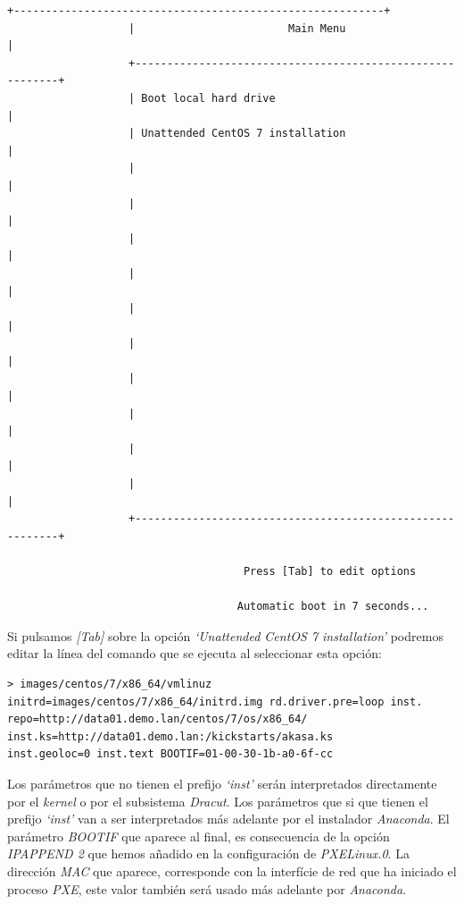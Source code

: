 \documentclass[a4paper,12pt,spanish,final]{epsc_tfc_pfc}
\begin{document}
\begin{lstlisting}[style=dnsmasq]
                   +----------------------------------------------------------+
                   |                        Main Menu                         |
                   +----------------------------------------------------------+
                   | Boot local hard drive                                    |
                   | Unattended CentOS 7 installation                         |
                   |                                                          |
                   |                                                          |
                   |                                                          |
                   |                                                          |
                   |                                                          |
                   |                                                          |
                   |                                                          |
                   |                                                          |
                   |                                                          |
                   |                                                          |
                   +----------------------------------------------------------+

                                     Press [Tab] to edit options

                                    Automatic boot in 7 seconds...
\end{lstlisting}

Si pulsamos \emph{[Tab]} sobre la opción \emph{`Unattended CentOS 7 installation'} podremos editar la línea del comando que se ejecuta al seleccionar esta opción:\\

\begin{lstlisting}[style=dnsmasq]
> images/centos/7/x86_64/vmlinuz initrd=images/centos/7/x86_64/initrd.img rd.driver.pre=loop inst.
repo=http://data01.demo.lan/centos/7/os/x86_64/ inst.ks=http://data01.demo.lan:/kickstarts/akasa.ks
inst.geoloc=0 inst.text BOOTIF=01-00-30-1b-a0-6f-cc
\end{lstlisting}

Los parámetros que no tienen el prefijo \emph{`inst'} serán interpretados directamente por el \emph{kernel} o por el subsistema \emph{Dracut}. Los parámetros que si que tienen el prefijo \emph{`inst'} van a ser interpretados más adelante por el instalador \emph{Anaconda}. El parámetro \emph{BOOTIF} que aparece al final, es consecuencia de la opción \emph{IPAPPEND 2} que hemos añadido en la configuración de \emph{PXELinux.0}. La dirección \emph{MAC} que aparece, corresponde con la interfície de red que ha iniciado el proceso \emph{PXE}, este valor también será usado más adelante por \emph{Anaconda}.
\end{document}
